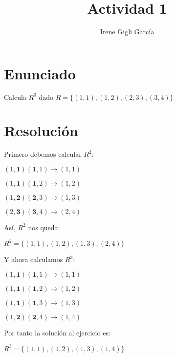 \documentclass[11pt]{article}
\title{\textbf{Actividad 1}}
\author{Irene Gigli García}
\date{}
\begin{document}
\maketitle

\section{Enunciado}

\begin{flushleft}
Calcula $R^3$ dado $R=\{(1,1),(1,2),(2,3),(3,4)\}$
\end{flushleft}

\section{Resolución}

\begin{flushleft}
Primero debemos calcular $R^2$:
\end{flushleft}

\begin{center}
$(1,\textbf{1}) (\textbf{1},1) \rightarrow (1,1)$

$(1,\textbf{1}) (\textbf{1},2) \rightarrow (1,2)$

$(1,\textbf{2}) (\textbf{2},3) \rightarrow (1,3)$

$(2,\textbf{3}) (\textbf{3},4) \rightarrow (2,4)$

\end{center}

\begin{flushleft}
Así, $R^2$ nos queda:
\end{flushleft}

\begin{center}
$R^2=\{(1,1),(1,2),
(1,3),(2,4)\}$
\end{center}

\begin{flushleft}
Y ahora calculamos $R^3$:
\end{flushleft}

\begin{center}
$(1,\textbf{1}) (\textbf{1},1) \rightarrow (1,1)$

$(1,\textbf{1}) (\textbf{1},2) \rightarrow (1,2)$

$(1,\textbf{1}) (\textbf{1},3) \rightarrow (1,3)$

$(1,\textbf{2}) (\textbf{2},4) \rightarrow (1,4)$
\end{center}

\begin{flushleft}
Por tanto la solución al ejercicio es:
\end{flushleft}

\begin{center}
$R^3=\{(1,1),(1,2),
(1,3),(1,4)\}$
\end{center}
\end{document}
